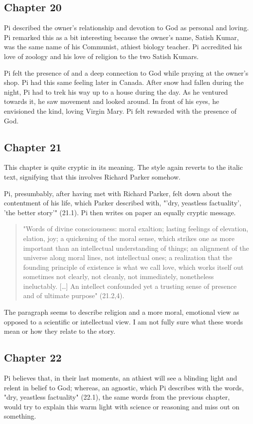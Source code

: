 \documentclass[11pt]{article}
\begin{document}
\subsection{Chapter 20}
\label{sec:org73c86d0}
Pi described the owner's relationship and devotion to God as personal and loving. Pi remarked this as a bit interesting because the owner's name, Satish Kumar, was the same name of his Communist, athiest biology teacher. Pi accredited his love of zoology and his love of religion to the two Satish Kumars.

Pi felt the presence of and a deep connection to God while praying at the owner's shop. Pi had this same feeling later in Canada. After snow had fallen during the night, Pi had to trek his way up to a house during the day. As he ventured towards it, he saw movement and looked around. In front of his eyes, he envisioned the kind, loving Virgin Mary. Pi felt rewarded with the presence of God.
\subsection{Chapter 21}
\label{sec:orgf370b61}
This chapter is quite cryptic in its meaning. The style again reverts to the italic text, signifying that this involves Richard Parker somehow.

Pi, presumbably, after having met with Richard Parker, felt down about the contentment of his life, which Parker described with, "'dry, yeastless factuality', 'the better story'" (21.1). Pi then writes on paper an equally cryptic message.

\begin{quote}
"Words of divine consciousness: moral exaltion; lasting feelings of elevation, elation, joy; a quickening of the moral sense, which strikes one as more important than an intellectual understanding of things; an alignment of the universe along moral lines, not intellectual ones; a realization that the founding principle of existence is what we call love, which works itself out sometimes not clearly, not cleanly, not immediately, nonetheless ineluctably. [\ldots{}] An intellect confounded yet a trusting sense of presence and of ultimate purpose" (21.2,4).
\end{quote}

The paragraph seems to describe religion and a more moral, emotional view as opposed to a scientific or intellectual view. I am not fully sure what these words mean or how they relate to the story.
\subsection{Chapter 22}
\label{sec:org962ceb6}
Pi believes that, in their last moments, an athiest will see a blinding light and relent in belief to God; whereas, an agnostic, which Pi describes with the words, "dry, yeastless factuality" (22.1), the same words from the previous chapter, would try to explain this warm light with science or reasoning and miss out on something.
\end{document}
